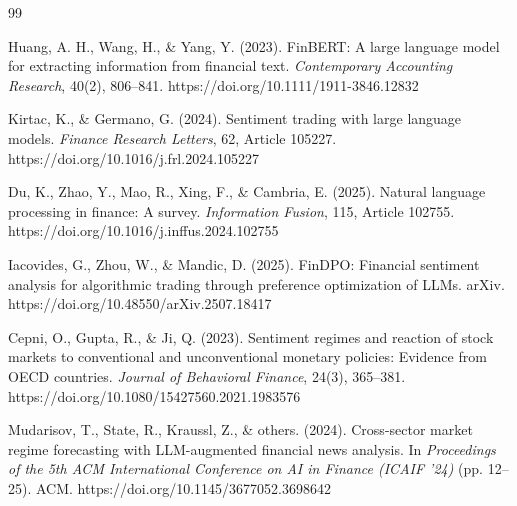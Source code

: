 \documentclass[12pt, a4paper]{report}
\begin{document}
\begin{thebibliography}{99}






Huang, A. H., Wang, H., \& Yang, Y. (2023). FinBERT: A large language model for extracting information from financial text. \textit{Contemporary Accounting Research}, 40(2), 806--841. https://doi.org/10.1111/1911-3846.12832

Kirtac, K., \& Germano, G. (2024). Sentiment trading with large language models. \textit{Finance Research Letters}, 62, Article 105227. https://doi.org/10.1016/j.frl.2024.105227

Du, K., Zhao, Y., Mao, R., Xing, F., \& Cambria, E. (2025). Natural language processing in finance: A survey. \textit{Information Fusion}, 115, Article 102755. https://doi.org/10.1016/j.inffus.2024.102755

Iacovides, G., Zhou, W., \& Mandic, D. (2025). FinDPO: Financial sentiment analysis for algorithmic trading through preference optimization of LLMs. arXiv. https://doi.org/10.48550/arXiv.2507.18417

Cepni, O., Gupta, R., \& Ji, Q. (2023). Sentiment regimes and reaction of stock markets to conventional and unconventional monetary policies: Evidence from OECD countries. \textit{Journal of Behavioral Finance}, 24(3), 365--381. https://doi.org/10.1080/15427560.2021.1983576


Mudarisov, T., State, R., Kraussl, Z., \& others. (2024). Cross-sector market regime forecasting with LLM-augmented financial news analysis. In \textit{Proceedings of the 5th ACM International Conference on AI in Finance (ICAIF '24)} (pp. 12--25). ACM. https://doi.org/10.1145/3677052.3698642


\end{thebibliography}
\end{document}
